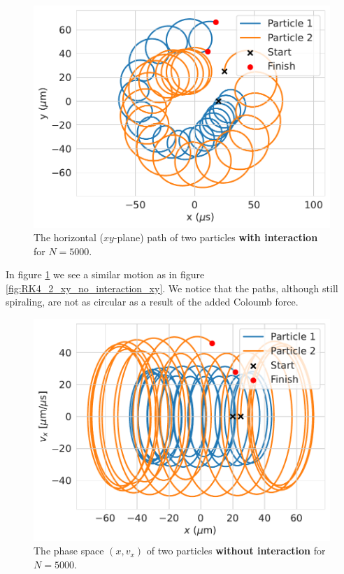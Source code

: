 \documentclass[english,notitlepage,reprint,nofootinbib]{revtex4-1}  %
\begin{document}
\begin{figure}[H]
    \centering
    \includegraphics[width=.5\textwidth]{../figures/2p_N5000_RK4_xy_interaction.pdf}
    \caption{The horizontal ($xy$-plane) path of two particles \textbf{with interaction} for $N = 5000$.}
    \label{fig:RK4_2_xy_with_interaction_xy}
\end{figure}

In figure \ref{fig:RK4_2_xy_with_interaction_xy} we see a similar motion as in figure \ref{fig:RK4_2_xy_no_interaction_xy}. We notice that the paths, although still spiraling, are not as circular as a result of the added Coloumb force.


\begin{figure}[H]
    \centering
    \includegraphics[width=.5\textwidth]{../figures/phase_space_x_RK4_N5000.pdf}
    \caption{The phase space $(x, v_x)$ of two particles \textbf{without interaction} for $N = 5000$.}
    \label{fig:RK4_2_x_phasespace_no_interaction_phasespace_xy}
\end{figure}
\end{document}
